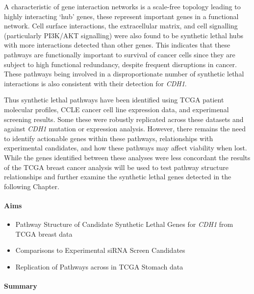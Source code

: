 A characteristic of gene interaction networks is a scale-free topology leading to highly interacting ‘hub’ genes, these represent important genes in a functional network. Cell surface interactions, the extracellular matrix, and cell signalling (particularly PI3K/AKT signalling) were also found to be synthetic lethal hubs with more interactions detected than other genes. This indicates that these pathways are functionally important to survival of cancer cells since they are subject to high functional redundancy, despite frequent disruptions in cancer. These pathways being involved in a disproportionate number of synthetic lethal interactions is also consistent with their detection for \textit{CDH1}.

Thus synthetic lethal pathways have been identified using TCGA patient molecular profiles, CCLE cancer cell line expression data, and experimenal screening results. Some these were robustly replicated across these datasets and against \textit{CDH1} mutation or expression analysis. However, there remains the need to identify actionable genes within these pathways, relationships with experimental candidates, and how these pathways may affect viability when lost. While the genes identified between these analyses were less concordant the results of the TCGA breast cancer analysis will be used to test pathway structure relationships and further examine the synthetic lethal genes detected in the following Chapter.

\clearpage

\paragraph{Aims}

  \begin{itemize}
   \item Pathway Structure of Candidate Synthetic Lethal Genes for \textit{\textit{CDH1}} from TCGA breast data
   
   \bigskip
   
   \item Comparisons to Experimental siRNA Screen Candidates
   
   \bigskip
   
   \item Replication of Pathways across in TCGA Stomach data
  \end{itemize}

\paragraph{Summary}

